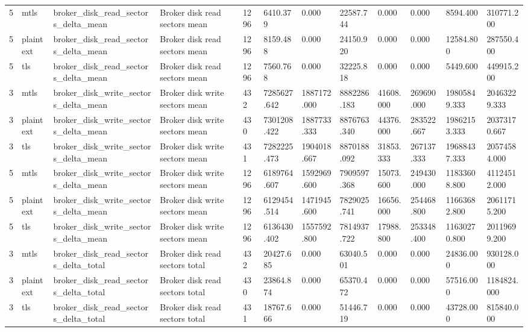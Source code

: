 \begin{longtable}{llllllllllll}
5 & mtls & broker\_disk\_read\_sectors\_delta\_mean & Broker disk read sectors mean & 1296 & 6410.379 & 0.000 & 22587.744 & 0.000 & 0.000 & 8594.400 & 310771.200 \\
5 & plaintext & broker\_disk\_read\_sectors\_delta\_mean & Broker disk read sectors mean & 1296 & 8159.488 & 0.000 & 24150.920 & 0.000 & 0.000 & 12584.800 & 287550.400 \\
5 & tls & broker\_disk\_read\_sectors\_delta\_mean & Broker disk read sectors mean & 1296 & 7560.768 & 0.000 & 32225.818 & 0.000 & 0.000 & 5449.600 & 449915.200 \\
3 & mtls & broker\_disk\_write\_sectors\_delta\_mean & Broker disk write sectors mean & 432 & 7285627.642 & 1887172.000 & 8882286.183 & 41608.000 & 269690.000 & 19805849.333 & 20463229.333 \\
3 & plaintext & broker\_disk\_write\_sectors\_delta\_mean & Broker disk write sectors mean & 430 & 7301208.422 & 1887733.333 & 8876763.340 & 44376.000 & 283522.667 & 19862153.333 & 20373170.667 \\
3 & tls & broker\_disk\_write\_sectors\_delta\_mean & Broker disk write sectors mean & 431 & 7282225.473 & 1904018.667 & 8870188.092 & 31853.333 & 267137.333 & 19688437.333 & 20574584.000 \\
5 & mtls & broker\_disk\_write\_sectors\_delta\_mean & Broker disk write sectors mean & 1296 & 6189764.607 & 1592969.600 & 7909597.368 & 15073.600 & 249430.000 & 11833608.800 & 41124512.000 \\
5 & plaintext & broker\_disk\_write\_sectors\_delta\_mean & Broker disk write sectors mean & 1296 & 6129454.514 & 1471945.600 & 7829025.741 & 16656.000 & 254468.800 & 11663682.800 & 20611715.200 \\
5 & tls & broker\_disk\_write\_sectors\_delta\_mean & Broker disk write sectors mean & 1296 & 6136430.402 & 1557592.800 & 7814937.722 & 17988.800 & 253348.400 & 11630270.800 & 20119699.200 \\
3 & mtls & broker\_disk\_read\_sectors\_delta\_total & Broker disk read sectors total & 432 & 20427.685 & 0.000 & 63040.501 & 0.000 & 0.000 & 24836.000 & 930128.000 \\
3 & plaintext & broker\_disk\_read\_sectors\_delta\_total & Broker disk read sectors total & 430 & 23864.874 & 0.000 & 65370.472 & 0.000 & 0.000 & 57516.000 & 1184824.000 \\
3 & tls & broker\_disk\_read\_sectors\_delta\_total & Broker disk read sectors total & 431 & 18767.666 & 0.000 & 51446.719 & 0.000 & 0.000 & 43728.000 & 815840.000 \\

\end{longtable}
